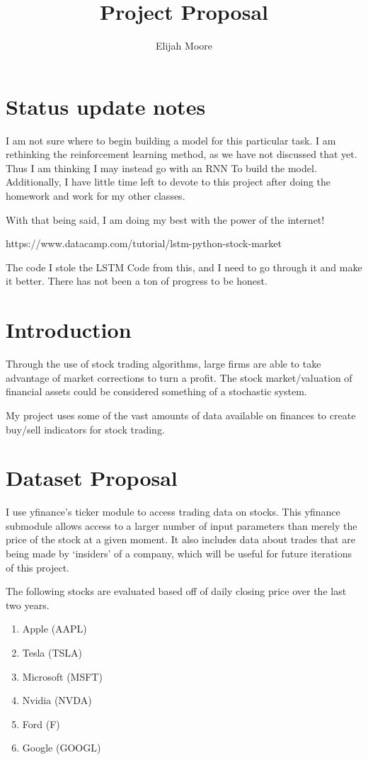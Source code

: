 \documentclass{article}
\title{Project Proposal}
\author{Elijah Moore}
\begin{document}
\maketitle
\section{Status update notes}
    I am not sure where to begin building a model for this particular task. I am rethinking the reinforcement learning method, as we have not discussed that yet.
    Thus I am thinking I may instead go with an RNN To build the model. Additionally,
    I have little time left to devote to this project after doing the homework and work for my other classes.

    With that being said, I am doing my best with the power of the internet!

    https://www.datacamp.com/tutorial/lstm-python-stock-market

    The code I stole the LSTM Code from this, and I need to go through it and make it better.
    There has not been a ton of progress to be honest.

\section{Introduction}

   Through the use of stock trading algorithms, large firms are able to take advantage of market corrections
   to turn a profit. The stock market/valuation of financial assets could be considered something of a stochastic system.
   
   My project uses some of the vast amounts of data available on finances to
   create buy/sell indicators for stock trading.

\section{Dataset Proposal}
    I use yfinance's ticker module to access trading data on stocks.
    This yfinance submodule allows access to a larger number of input parameters than merely the price of the stock at a given moment.
    It also includes data about trades that are being made by `insiders' of a company, which will be useful for future iterations of this project.

    The following stocks are evaluated based off of daily closing price over the last two years.
    \begin{enumerate}
        \item Apple (AAPL)
        \item Tesla (TSLA)
        \item Microsoft (MSFT)
        \item Nvidia (NVDA)
        \item Ford (F)
        \item Google (GOOGL)
    \end{enumerate}
\end{document}
